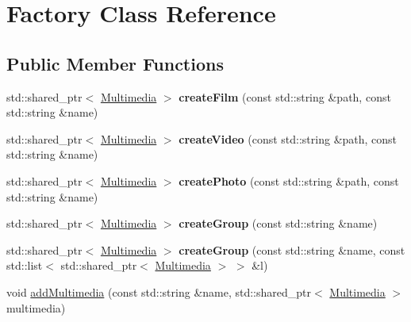 \hypertarget{class_factory}{\section{Factory Class Reference}
\label{class_factory}
}
\subsection*{Public Member Functions}
\begin{DoxyCompactItemize}
\item 
\hypertarget{class_factory_ae6742d502be528d8ed9372dc1971f872}{std\-::shared\-\_\-ptr$<$ \hyperlink{class_multimedia}{Multimedia} $>$ {\bfseries create\-Film} (const std\-::string \&path, const std\-::string \&name)}\label{class_factory_ae6742d502be528d8ed9372dc1971f872}

\item 
\hypertarget{class_factory_ad5e2fe94c0d667d895b91f15f66910d2}{std\-::shared\-\_\-ptr$<$ \hyperlink{class_multimedia}{Multimedia} $>$ {\bfseries create\-Video} (const std\-::string \&path, const std\-::string \&name)}\label{class_factory_ad5e2fe94c0d667d895b91f15f66910d2}

\item 
\hypertarget{class_factory_a6f422e72bec7bcdaac528b1a14609ff5}{std\-::shared\-\_\-ptr$<$ \hyperlink{class_multimedia}{Multimedia} $>$ {\bfseries create\-Photo} (const std\-::string \&path, const std\-::string \&name)}\label{class_factory_a6f422e72bec7bcdaac528b1a14609ff5}

\item 
\hypertarget{class_factory_ae44fed6cd7f54edbded7d01f3a761d73}{std\-::shared\-\_\-ptr$<$ \hyperlink{class_multimedia}{Multimedia} $>$ {\bfseries create\-Group} (const std\-::string \&name)}\label{class_factory_ae44fed6cd7f54edbded7d01f3a761d73}

\item 
\hypertarget{class_factory_aa94aa2b2e3127c5298209f201c4e356f}{std\-::shared\-\_\-ptr$<$ \hyperlink{class_multimedia}{Multimedia} $>$ {\bfseries create\-Group} (const std\-::string \&name, const std\-::list$<$ std\-::shared\-\_\-ptr$<$ \hyperlink{class_multimedia}{Multimedia} $>$ $>$ \&l)}\label{class_factory_aa94aa2b2e3127c5298209f201c4e356f}

\item 
\hypertarget{class_factory_a55d75bb11685bd4f921fe8a014b3f0a5}{void \hyperlink{class_factory_a55d75bb11685bd4f921fe8a014b3f0a5}{add\-Multimedia} (const std\-::string \&name, std\-::shared\-\_\-ptr$<$ \hyperlink{class_multimedia}{Multimedia} $>$ multimedia)}\label{class_factory_a55d75bb11685bd4f921fe8a014b3f0a5}


\end{DoxyCompactItemize}
